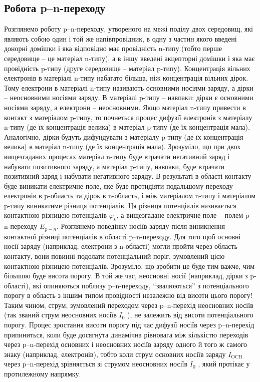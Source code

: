 \documentclass[
  ukrainian,
  14pt
]{extreport}
\begin{document}
\subsection{Робота p–n-переходу}
Розглянемо роботу p–n-переходу, утвореного на межі поділу двох середовищ, які
являють собою один і той же напівпровідник, в одну з частин якого введені
донорні домішки і яка відповідно має провідність n-типу (тобто перше
середовище – це матеріал n-типу), а в іншу введені акцепторні домішки і яка має
провідність p-типу (друге середовище – матеріал p-типу). Концентрація вільних
електронів в матеріалі n-типу набагато більша, ніж концентрація вільних дірок.
Тому електрони в матеріалі n-типу називають основними носіями заряду, а дірки
– неосновними носіями заряду. В матеріалі p-типу – навпаки: дірки є основними
носіями заряду, а електрони – неосновними. Якщо матеріал n-типу привести в
контакт з матеріалом p-типу, то почнеться процес дифузії електронів з матеріалу
n-типу (де їх концентрація велика) в матеріал p-типу (де їх концентрація мала).
Аналогічно, дірки будуть дифундувати з матеріалу p-типу (де їх концентрація
велика) в матеріал n-типу (де їх концентрація мала). Зрозуміло, що при двох
вищезгаданих процесах матеріал n-типу буде втрачати негативний заряд і
набувати позитивного заряду, а матеріал p-типу, навпаки, буде втрачати
позитивний заряд і набувати негативного заряду. В результаті в області контакту
буде виникати електричне поле, яке буде протидіяти подальшому переходу
електронів в p-область та дірок в n-область, і між матеріалом n-типу і матеріалом
p-типу виникатиме різниця потенціалів. Ця різниця потенціалів називається
контактною різницею потенціалів $\varphi_k$, а вищезгадане електричне поле – полем
p–n-переходу $E_{p−n}$.
Розглянемо поведінку носіїв заряду після виникнення контактної різниці
потенціалів в області p–n-переходу. Для того щоб основні носії заряду
(наприклад, електрони з n-області) могли пройти через область контакту, вони
повинні подолати потенціальний поріг, зумовлений цією контактною різницею
потенціалів. Зрозуміло, що зробити це буде тим важче, чим більшою буде висота
порогу. В той же час, неосновні носії (наприклад, дірки з p-області), які
опиняються поблизу p–n-переходу, ``звалюються'' з потенціального порогу в
область з іншим типом провідності незалежно від висоти цього порогу! Таким
чином, струм, зумовлений переходом через p–n-перехід неосновних носіїв (так
званий струм неосновних носіїв $I_0$ ), не залежить від висоти потенціального
порогу.
Процес зростання висоти порогу під час дифузії носіїв через p–n-перехід
припиниться, коли буде досягнута динамічна рівновага між кількістю переходів
через p–n-перехід основних і неосновних носіїв заряду одного й того ж самого
знаку (наприклад, електронів), тобто коли струм основних носіїв заряду $I_{\text{OCH}}$
через p–n-перехід зрівняється зі струмом неосновних носіїв $I_0$ , який протікає у
протилежному напрямку.
\end{document}
